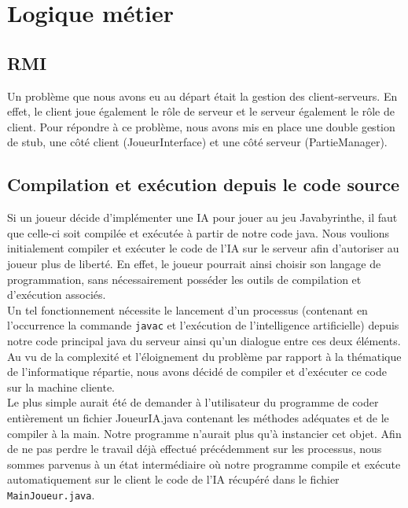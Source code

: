 \section{Logique métier}

    \subsection{RMI}
        Un problème que nous avons eu au départ était la gestion des client-serveurs. En effet, le client joue également le rôle de serveur et le serveur également le rôle de client. Pour répondre à ce problème, nous avons mis en place une double gestion de stub, une côté client (JoueurInterface) et une côté serveur (PartieManager).

    \subsection{Compilation et exécution depuis le code source}
	\label{problemes_IA}

        Si un joueur décide d'implémenter une IA pour jouer au jeu Javabyrinthe, il faut que celle-ci soit compilée et exécutée à partir de notre code java. Nous voulions initialement compiler et exécuter le code de l'IA sur le serveur afin d'autoriser au joueur plus de liberté. En effet, le joueur pourrait ainsi choisir son langage de programmation, sans nécessairement posséder les outils de compilation et d'exécution associés. \\

		Un tel fonctionnement nécessite le lancement d'un processus (contenant en l'occurrence la commande \texttt{javac} et l'exécution de l'intelligence artificielle) depuis notre code principal java du serveur ainsi qu'un dialogue entre ces deux éléments. Au vu de la complexité et l'éloignement du problème par rapport à la thématique de l'informatique répartie, nous avons décidé de compiler et d'exécuter ce code sur la machine cliente. \\

		Le plus simple aurait été de demander à l'utilisateur du programme de coder entièrement un fichier JoueurIA.java contenant les méthodes adéquates et de le compiler à la main. Notre programme n'aurait plus qu'à instancier cet objet. Afin de ne pas perdre le travail déjà effectué précédemment sur les processus, nous sommes parvenus à un état intermédiaire où notre programme compile et exécute automatiquement sur le client le code de l'IA récupéré dans le fichier \texttt{MainJoueur.java}.


